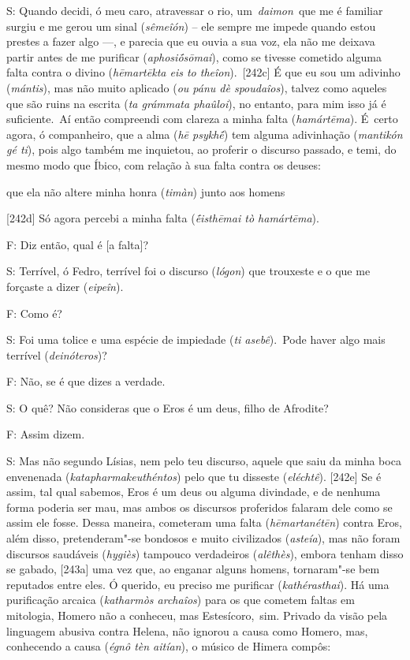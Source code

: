 S: Quando decidi, ó meu caro, atravessar o rio, um~\emph{daimon}~que me
é familiar surgiu e me gerou um sinal (\emph{sêmeîón}) -- ele sempre me
impede quando estou prestes a fazer algo \mbox{---,} e parecia que eu ouvia a
sua voz, ela não me deixava partir antes de me purificar
(\emph{aphosiṓsōmai}), como se tivesse cometido alguma falta contra o
divino (\emph{hēmartēkta eis to theîon}).~[242c] É que eu sou um
adivinho (\emph{mántis}), mas não muito aplicado (\emph{ou pánu dè
spoudaîos}), talvez como aqueles que são ruins na escrita (\emph{ta
grámmata phaûloi}), no entanto, para mim isso já é suficiente.~Aí então
compreendi com clareza a minha falta (\emph{hamártēma}). É~certo agora,
ó companheiro, que a alma (\emph{hē psykhḗ}) tem alguma adivinhação
(\emph{mantikón gé ti}), pois algo também me inquietou, ao proferir o
discurso passado, e temi, do mesmo modo que Íbico, com relação à sua
falta contra os deuses:

 

que ela não altere minha honra (\emph{timàn}) junto aos homens

 

[242d] Só agora percebi a minha falta (\emph{ḗisthēmai tò
hamártēma}).

 

F: Diz então, qual é [a falta]?

 

S: Terrível, ó Fedro, terrível foi o discurso (\emph{lógon}) que
trouxeste e o que me forçaste a dizer (\emph{eipeîn}).

 

F: Como é?

 

S: Foi uma tolice e uma espécie de impiedade (\emph{ti asebê}).~Pode
haver algo mais terrível (\emph{deinóteros})?

 

F: Não, se é que dizes a verdade.

 

S: O quê? Não consideras que o Eros é um deus, filho de Afrodite?

 

F: Assim dizem.

 

S: Mas não segundo Lísias, nem pelo teu discurso, aquele que saiu da
minha boca envenenada (\emph{katapharmakeuthéntos}) pelo que tu disseste
(\emph{eléchtê}). [242e] Se é assim, tal qual sabemos, Eros é um
deus ou alguma divindade, e de nenhuma forma poderia ser mau, mas ambos
os discursos proferidos falaram dele como se assim ele fosse. Dessa
maneira, cometeram uma falta (\emph{hēmartanétēn}) contra Eros, além
disso, pretenderam"-se bondosos e muito civilizados (\emph{asteía}), mas
não foram discursos saudáveis (\emph{hygiès}) tampouco verdadeiros
(\emph{alêthès}), embora tenham disso se gabado, [243a] uma vez que,
ao enganar alguns homens, tornaram"-se bem reputados entre eles. Ó
querido, eu preciso me purificar (\emph{kathérasthai}). Há uma
purificação arcaica (\emph{katharmòs archaîos}) para os que cometem
faltas em mitologia, Homero não a conheceu, mas Estesícoro,~sim. Privado
da visão pela linguagem abusiva contra Helena, não ignorou a causa como
Homero, mas, conhecendo a causa (\emph{égnô tèn aitían}), o músico de
Himera compôs:

